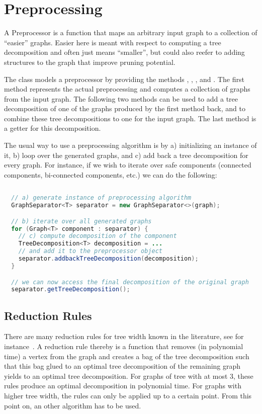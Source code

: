 \documentclass[a4paper, ukenglish, twoside, openright]{jdrasilmanual}
\begin{document}
\chapter{Preprocessing}
A Preprocessor is a function that maps an arbitrary input graph to a collection of ``easier'' graphs. 
Easier here is meant with respect to computing a tree decomposition and often just means ``smaller'', but 
could also reefer to adding structures to the graph that improve pruning potential.
 
The class  models a preprocessor by providing the
methods , ,
, and . The
first method represents the actual preprocessing and computes a
collection of graphs from the input graph.  The following two methods
can be used to add a tree decomposition of one of the graphs produced
by the first method back, and to combine these tree decompositions to
one for the input graph. The last method is a getter for this
decomposition.

The usual way to use a preprocessing algorithm is by a) initializing an
instance of it, b) loop over the generated graphs, and c) add back a
tree decomposition for every graph. For instance, if we wish to
iterate over safe components (connected components, bi-connected
components, etc.) we can do the following:
\begin{lstlisting}[language=Java]
  
  // a) generate instance of preprocessing algorithm
  GraphSeparator<T> separator = new GraphSeparator<>(graph);

  // b) iterate over all generated graphs
  for (Graph<T> component : separator) {
    // c) compute decomposition of the component
    TreeDecomposition<T> decomposition = ... 
    // and add it to the preprocessor object
    separator.addbackTreeDecomposition(decomposition);
  }

  // we can now access the final decomposition of the original graph
  separator.getTreeDecomposition();
\end{lstlisting}

\section{Reduction Rules}
There are many reduction rules for tree width known in the
literature, see for instance~\cite{DowneyF2013}. A reduction rule thereby is a function that removes (in
polynomial time) a vertex from the graph and creates a bag of the
tree decomposition such that this bag glued to an optimal
tree decomposition of the remaining graph yields to an optimal
tree decomposition. For graphs of tree with at most 3, these rules
produce an optimal decomposition in polynomial time.  For graphs with
higher tree width, the rules can only be applied up to a certain
point. From this point on, an other algorithm has to be used.
\end{document}
